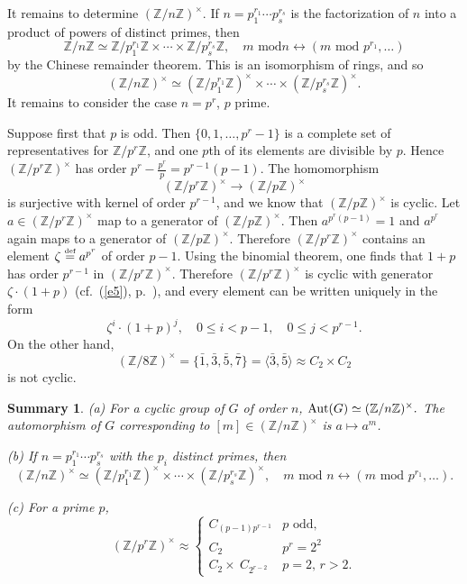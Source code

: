 \documentclass[a4paper,11pt,final]{memoir}%
\newtheorem{summary}[X]{Summary}
\theoremstyle{nonumberplain}
\begin{document}
It remains to determine $(\mathbb{Z}/n\mathbb{Z})^{\times}$. If $n=p_{1}%
^{r_{1}}\cdots p_{s}^{r_{s}}$ is the factorization of $n$ into a product of
powers of distinct primes, then%
\[
\mathbb{Z}/n\mathbb{Z}\simeq\mathbb{Z}/p_{1}^{r_{1}}\mathbb{Z}\times
\cdots\times\mathbb{Z}/p_{s}^{r_{s}}\mathbb{Z},\quad m\text{ mod
}n\leftrightarrow(m\text{ mod }p^{r_{1}},\ldots)
\]
by the Chinese remainder theorem. This is an isomorphism of rings, and so%
\[
(\mathbb{Z}/n\mathbb{Z})^{\times}\simeq(\mathbb{Z}/p_{1}^{r_{1}}%
\mathbb{Z})^{\times}\times\cdots\times(\mathbb{Z}/p_{s}^{r_{s}}\mathbb{Z}%
)^{\times}.
\]
It remains to consider the case $n=p^{r}$, $p$ prime.

Suppose first that $p$ is odd. Then $\{0,1,\ldots,p^{r}-1\}$ is a complete set
of representatives for $\mathbb{Z}/p^{r}\mathbb{Z}$, and one $p$th of its
elements are divisible by $p$. Hence $(\mathbb{Z}/p^{r}\mathbb{Z})^{\times}$
has order $p^{r}-\frac{p^{r}}{p}=p^{r-1}(p-1)$. The homomorphism%
\[
(\mathbb{Z}/p^{r}\mathbb{Z})^{\times}\rightarrow(\mathbb{Z}/p\mathbb{Z}%
)^{\times}%
\]
is surjective with kernel of order $p^{r-1}$, and we know that $(\mathbb{Z}%
/p\mathbb{Z})^{\times}$ is cyclic. Let $a\in(\mathbb{Z}/p^{r}\mathbb{Z}%
)^{\times}$ map to a generator of $(\mathbb{Z}{}/p\mathbb{Z}{})^{\times}$.
Then $a^{p^{r}(p-1)}=1$ and $a^{p^{r}}$ again maps to a generator of
$(\mathbb{Z}{}/p\mathbb{Z}{})^{\times}$. Therefore $(\mathbb{Z}{}%
/p^{r}\mathbb{Z}{})^{\times}$ contains an element $\zeta
\overset{\textup{{\tiny def}}}{=}a^{p^{r}}$ of order $p-1$. Using the binomial
theorem, one finds that $1+p$ has order $p^{r-1}$ in $(\mathbb{Z}%
/p^{r}\mathbb{Z})^{\times}$. Therefore $(\mathbb{Z}/p^{r}\mathbb{Z})^{\times}$
is cyclic with generator $\zeta\cdot(1+p)$ (cf.\ (\ref{e5}), p.~\pageref{e5}),
and every element can be written uniquely in the form
\[
\zeta^{i}\cdot(1+p)^{j},\quad0\leq i<p-1,\quad0\leq j<p^{r-1}.
\]
On the other hand,
\[
(\mathbb{Z}/8\mathbb{Z})^{\times}=\{\bar{1},\bar{3},\bar{5},\bar{7}%
\}=\langle\bar{3},\bar{5}\rangle\approx C_{2}\times C_{2}%
\]
is not cyclic.

\begin{summary}
\label{it10}(a) For a cyclic group of $G$ of order $n$, $\operatorname{Aut}(G)\simeq
(\mathbb{Z}{}/n\mathbb{Z}{})^{\times}.$ The automorphism of $G$ corresponding
to $[m]\in(\mathbb{Z}/n\mathbb{Z}{})^{\times}$ is $a\mapsto a^{m}$.

(b) If $n=p_{1}^{r_{1}}\cdots p_{s}^{r_{s}}$ with the $p_{i}$ distinct primes,
then%
\[
(\mathbb{Z}/n\mathbb{Z})^{\times}\simeq(\mathbb{Z}/p_{1}^{r_{1}}%
\mathbb{Z})^{\times}\times\cdots\times(\mathbb{Z}/p_{s}^{r_{s}}\mathbb{Z}%
)^{\times},\quad m\text{ mod }n\leftrightarrow(m\text{ mod }p^{r_{1}}%
,\ldots).
\]


(c) For a prime $p$,%
\[
(\mathbb{Z}/p^{r}\mathbb{Z})^{\times}\approx%
\begin{cases}
C_{(p-1)p^{r-1}} & p\text{ odd,}\\
C_{2} & p^{r}=2^{2}\\
C_{2}\times\ C_{2^{r-2}} & p=2\text{, }r>2.
\end{cases}
\]

\end{summary}
\end{document}
